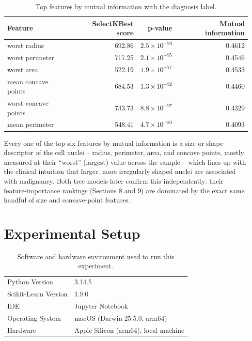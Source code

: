 \documentclass[11pt,a4paper]{article}
\begin{document}
\begin{table}[h]
\centering
\small
\begin{tabular}{@{}lrrr@{}}
\toprule
Feature & SelectKBest score & p-value & Mutual information \\
\midrule
worst radius & 692.86 & $2.5\times10^{-93}$ & 0.4612 \\
worst perimeter & 717.25 & $2.1\times10^{-95}$ & 0.4546 \\
worst area & 522.19 & $1.9\times10^{-77}$ & 0.4533 \\
mean concave points & 684.53 & $1.3\times10^{-92}$ & 0.4460 \\
worst concave points & 733.73 & $8.8\times10^{-97}$ & 0.4329 \\
mean perimeter & 548.41 & $4.7\times10^{-80}$ & 0.4093 \\
\bottomrule
\end{tabular}
\caption{Top features by mutual information with the diagnosis label.}
\end{table}
Every one of the top six features by mutual information is a size or shape descriptor of the cell nuclei -- radius, perimeter, area, and concave points, mostly measured at their ``worst'' (largest) value across the sample -- which lines up with the clinical intuition that larger, more irregularly shaped nuclei are associated with malignancy. Both tree models later confirm this independently: their feature-importance rankings (Sections 8 and 9) are dominated by the exact same handful of size and concave-point features.

\section{Experimental Setup}
\begin{table}[h]
\centering
\begin{tabular}{ll}
\toprule
Python Version & 3.14.5 \\
Scikit-Learn Version & 1.9.0 \\
IDE & Jupyter Notebook \\
Operating System & macOS (Darwin 25.5.0, arm64) \\
Hardware & Apple Silicon (arm64), local machine \\
\bottomrule
\end{tabular}
\caption{Software and hardware environment used to run this experiment.}
\end{table}
\end{document}
